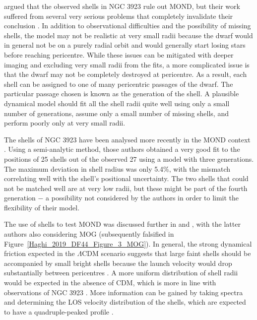 \documentclass[fleqn,usenatbib,useAMS,onecolumn]{mnras} %
\begin{document}
\citet{Hernquist_1987} argued that the observed shells in NGC 3923 rule out MOND, but their work suffered from several very serious problems that completely invalidate their conclusion \citep{Milgrom_1988}. In addition to observational difficulties and the possibility of missing shells, the model may not be realistic at very small radii because the dwarf would in general not be on a purely radial orbit and would generally start losing stars before reaching pericentre. While these issues can be mitigated with deeper imaging and excluding very small radii from the fits, a more complicated issue is that the dwarf may not be completely destroyed at pericentre. As a result, each shell can be assigned to one of many pericentric passages of the dwarf. The particular passage chosen is known as the generation of the shell. A plausible dynamical model should fit all the shell radii quite well using only a small number of generations, assume only a small number of missing shells, and perform poorly only at very small radii.

The shells of NGC 3923 have been analysed more recently in the MOND context \citep{Bilek_2013}. Using a semi-analytic method, those authors obtained a very good fit to the positions of 25 shells out of the observed 27 using a model with three generations. The maximum deviation in shell radius was only 5.4\%, with the mismatch correlating well with the shell's positional uncertainty. The two shells that could not be matched well are at very low radii, but these might be part of the fourth generation $-$ a possibility not considered by the authors in order to limit the flexibility of their model.

The use of shells to test MOND was discussed further in \citet{Bilek_2015} and \citet{Vakili_2017}, with the latter authors also considering MOG (subsequently falsified in Figure~\ref{Haghi_2019_DF44_Figure_3_MOG}). In general, the strong dynamical friction expected in the $\Lambda$CDM scenario suggests that large faint shells should be accompanied by small bright shells because the launch velocity would drop substantially between pericentres \citep{Vakili_2017}. A more uniform distribution of shell radii would be expected in the absence of CDM, which is more in line with observations of NGC 3923 \citep{Bilek_2016}. More information can be gained by taking spectra and determining the LOS velocity distribution of the shells, which are expected to have a quadruple-peaked profile \citep{Bilek_2015_line}.
\end{document}
